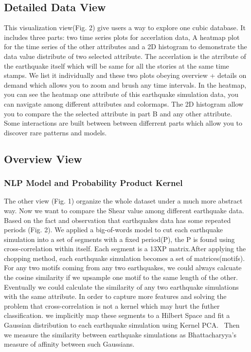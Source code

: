 \subsection{Detailed Data View}
\label{sec:context }
This visualization view(Fig. 2) give users a way to explore one cubic database. It includes three parts: two time series plots for accerlation data, A heatmap plot for the time series of the other attributes and a 2D histogram to demonstrate the data value distribute of two selected attribute. The accerlation is the atrribute of the earthquake itself which will be same for all the stories at the same time stamps. We list it individually and these two plots obeying overview + details on demand which allows you to zoom and brush any  time intervals. In the heatmap, you can see the heatmap one attribute of this earthquake simulation data, you can navigate among different attributes and colormaps. The 2D histogram allow you to compare the the selected attribute in part B and any other attribute. Some interactions are built between between differrent parts which allow you to discover rare patterns and models.

\subsection{Overview View}
\label{sec:context }

\subsubsection{NLP Model and Probability Product Kernel}
\label{method}
The other view (Fig. 1) organize the whole dataset under a much more abstract way. Now we want to compare the Shear value among different earthquake data. Based on the fact and observation that earthquakes data has some repeated periods (Fig. 2).  We applied a big-of-words model to cut each earthquake simulation into a set of segments with a fixed period(P), the P is found using cross-correlation within itself. Each segment is a 13XP matrix.After applying the chopping method, each earthquake simulation becomes a set of matrices(motifs). For any two motifs coming from any two earthquakes, we could always calcuate the cosine similarity if we upsample one motif to the same length of the other. Eventually we could calculate the similarity of any two earthquake simulations with the same attribute. In order to capture more features and solving the problem that cross-correlation is not a kernel which may hurt the futher classification. we implicitly map these segments to a Hilbert Space and fit a Gaussian distribution to each earthquake simulation using Kernel PCA.~\cite{conf/icml/KondorJ03} Then we measure the similarity between earthquake simulations as Bhattacharyya’s measure of affinity between such Gaussians.
